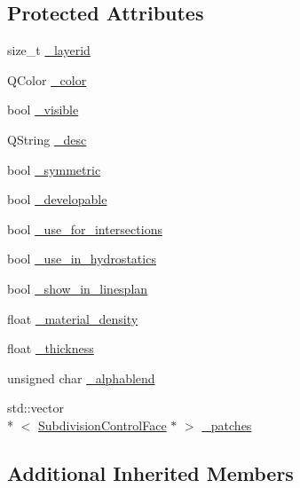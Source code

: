 \subsection*{Protected Attributes}
\begin{DoxyCompactItemize}
\item 
size\-\_\-t \hyperlink{classShipCAD_1_1SubdivisionLayer_a73e4956d179d6ebd6c062e7e76bca196}{\-\_\-layerid}
\item 
Q\-Color \hyperlink{classShipCAD_1_1SubdivisionLayer_a6da22248952737662360fa3b2730a35f}{\-\_\-color}
\item 
bool \hyperlink{classShipCAD_1_1SubdivisionLayer_a2d606476aba40bbbfc115c449f46ac26}{\-\_\-visible}
\item 
Q\-String \hyperlink{classShipCAD_1_1SubdivisionLayer_a33bbfedf8f0d130d91c74a65a575eb2a}{\-\_\-desc}
\item 
bool \hyperlink{classShipCAD_1_1SubdivisionLayer_aaeddcdf1d08d84c76c5453f4a71fbe7a}{\-\_\-symmetric}
\item 
bool \hyperlink{classShipCAD_1_1SubdivisionLayer_a81dad738f58f9b4632c1575d0b59ddb0}{\-\_\-developable}
\item 
bool \hyperlink{classShipCAD_1_1SubdivisionLayer_a8213aa3e02493472fb11949f595446f2}{\-\_\-use\-\_\-for\-\_\-intersections}
\item 
bool \hyperlink{classShipCAD_1_1SubdivisionLayer_ad36d65882f0c46ff1b3ced7d48c173f4}{\-\_\-use\-\_\-in\-\_\-hydrostatics}
\item 
bool \hyperlink{classShipCAD_1_1SubdivisionLayer_a373fd987b5f973a995517e7f97fda5ac}{\-\_\-show\-\_\-in\-\_\-linesplan}
\item 
float \hyperlink{classShipCAD_1_1SubdivisionLayer_adfdd4e996a5be7147a2eeb682dd93ff8}{\-\_\-material\-\_\-density}
\item 
float \hyperlink{classShipCAD_1_1SubdivisionLayer_a00a308fdf03a0c1d9a6fa65f965e7942}{\-\_\-thickness}
\item 
unsigned char \hyperlink{classShipCAD_1_1SubdivisionLayer_a1681170da038b0708d1b4dcd2ec89b81}{\-\_\-alphablend}
\item 
std\-::vector\\*
$<$ \hyperlink{classShipCAD_1_1SubdivisionControlFace}{Subdivision\-Control\-Face} $\ast$ $>$ \hyperlink{classShipCAD_1_1SubdivisionLayer_a98b25b86a7104e4f987d34506438113f}{\-\_\-patches}
\end{DoxyCompactItemize}
\subsection*{Additional Inherited Members}


